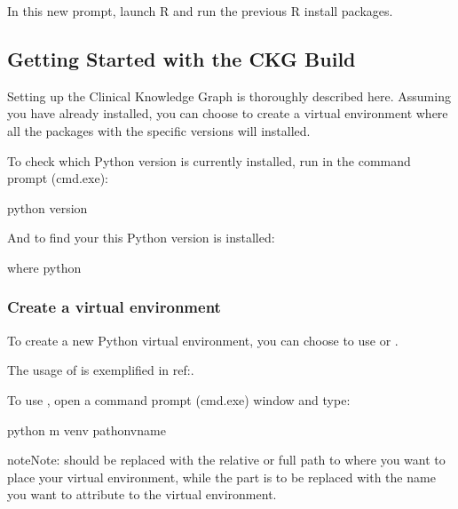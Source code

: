 \documentclass[letterpaper,10pt,english]{sphinxmanual}
\begin{document}
In this new prompt, launch R and run the previous R install packages.


\subsection{Getting Started with the CKG Build}
\label{\detokenize{intro/getting-started-with-windows:getting-started-with-the-ckg-build}}
Setting up the Clinical Knowledge Graph is thoroughly described here.
Assuming you have  already installed, you can choose to create a virtual environment where all the packages with the specific versions will installed.

To check which Python version is currently installed, run in the command prompt (cmd.exe):

\begin{sphinxVerbatim}[commandchars=\\\{\}]
\PYGZgt{} python \PYGZhy{}\PYGZhy{}version
\end{sphinxVerbatim}

And to find your this Python version is installed:

\begin{sphinxVerbatim}[commandchars=\\\{\}]
\PYGZgt{} where python
\end{sphinxVerbatim}


\subsubsection{Create a virtual environment}
\label{\detokenize{intro/getting-started-with-windows:create-a-virtual-environment}}
To create a new Python virtual environment, you can choose to use  or .

The usage of  is exemplified in ref:.

To use , open a command prompt (cmd.exe) window and type:

\begin{sphinxVerbatim}[commandchars=\\\{\}]
\PYGZgt{} python \PYGZhy{}m venv pathonv\PYGZus{}name
\end{sphinxVerbatim}

\begin{sphinxadmonition}{note}{Note:}
 should be replaced with the relative or full path to where you want to place your virtual environment, while the  part is to be replaced with the name you want to attribute to the virtual environment.
\end{sphinxadmonition}
\end{document}
